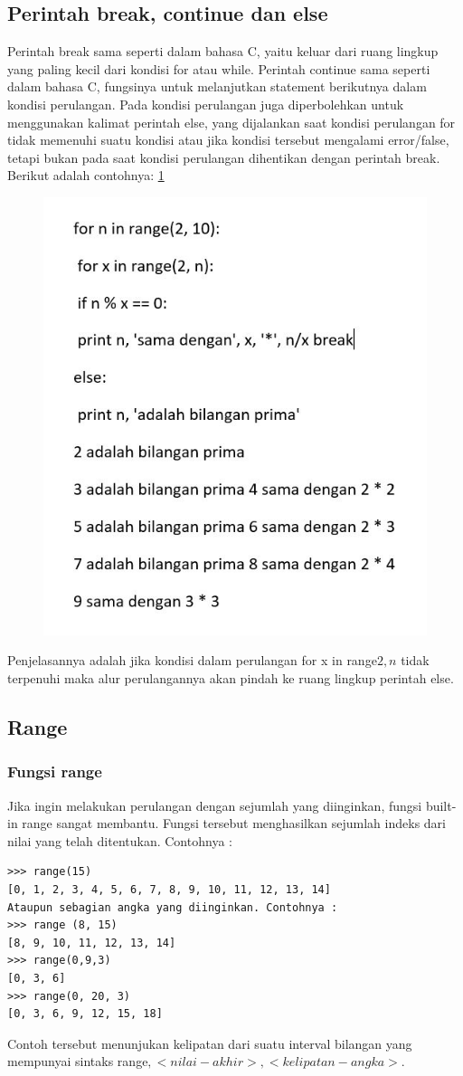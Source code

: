 \subsection{Perintah break, continue dan else}
 Perintah break sama seperti dalam bahasa C, yaitu keluar dari ruang lingkup yang paling kecil dari
kondisi for atau while.
Perintah continue sama  seperti dalam bahasa C, fungsinya untuk melanjutkan statement
berikutnya dalam kondisi perulangan.
Pada kondisi perulangan juga diperbolehkan untuk menggunakan kalimat perintah else, yang dijalankan saat kondisi perulangan for tidak memenuhi suatu kondisi atau jika kondisi tersebut mengalami error/false, tetapi bukan pada saat kondisi perulangan dihentikan dengan perintah break. Berikut adalah contohnya:
\ref{2bce}

\begin{figure}[ht]
    \centerline{\includegraphics[width=.5\textwidth]{figures/2bce.JPG}}
    \caption{}
    \label{2bce}
    \end{figure}

Penjelasannya adalah jika kondisi dalam perulangan for x in range\(2, n\) tidak terpenuhi maka alur perulangannya akan pindah ke ruang lingkup perintah else. 

\subsection{Range}
\subsubsection{Fungsi range\(\)}
Jika ingin melakukan perulangan dengan sejumlah yang diinginkan, fungsi built-in range sangat membantu. Fungsi tersebut menghasilkan sejumlah indeks dari nilai yang telah ditentukan. 
Contohnya :
\begin{verbatim}
>>> range(15)
[0, 1, 2, 3, 4, 5, 6, 7, 8, 9, 10, 11, 12, 13, 14]
Ataupun sebagian angka yang diinginkan. Contohnya :
>>> range (8, 15)
[8, 9, 10, 11, 12, 13, 14]
>>> range(0,9,3)
[0, 3, 6]
>>> range(0, 20, 3)
[0, 3, 6, 9, 12, 15, 18]
\end{verbatim}
 Contoh tersebut menunjukan kelipatan dari suatu interval bilangan yang mempunyai sintaks range\(<nilai-awal>, <nilai-akhir>, <kelipatan-angka>\).
